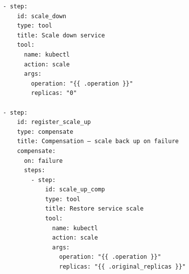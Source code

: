 \begin{verbatim}
- step:
    id: scale_down
    type: tool
    title: Scale down service
    tool:
      name: kubectl
      action: scale
      args:
        operation: "{{ .operation }}"
        replicas: "0"

- step:
    id: register_scale_up
    type: compensate
    title: Compensation — scale back up on failure
    compensate:
      on: failure
      steps:
        - step:
            id: scale_up_comp
            type: tool
            title: Restore service scale
            tool:
              name: kubectl
              action: scale
              args:
                operation: "{{ .operation }}"
                replicas: "{{ .original_replicas }}"
\end{verbatim}

